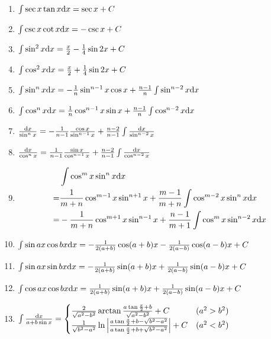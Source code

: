 \begin{small}
\begin{enumerate}
\item $ \int \sec x \tan x \mathrm{d} x = \sec x + C $

\item $ \int \csc x \cot x \mathrm{d} x = -\csc x + C $

\item $ \int \sin^2 x \mathrm{d} x = \frac{x}{2} - \frac{1}{4} \sin 2x + C $

\item $ \int \cos^2 x \mathrm{d} x = \frac{x}{2} + \frac{1}{4} \sin 2x + C $

\item $ \int \sin^n x \mathrm{d} x = -\frac{1}{n} \sin^{n-1} x \cos x + \frac{n-1}{n} \int \sin^{n-2} x \mathrm{d} x $

\item $ \int \cos^n x \mathrm{d} x = \frac{1}{n} \cos^{n-1} x \sin x + \frac{n-1}{n} \int \cos^{n-2} x \mathrm{d} x $

\item $ \frac{\mathrm{d} x}{\sin^n x} = -\frac{1}{n-1} \frac{\cos x}{\sin^{n-1}x} + \frac{n-2}{n-1} \int \frac{\mathrm{d} x}{\sin^{n-2}x} $

\item $ \frac{\mathrm{d} x}{\cos^n x} = \frac{1}{n-1} \frac{\sin x}{\cos^{n-1}x} + \frac{n-2}{n-1} \int \frac{\mathrm{d} x}{\cos^{n-2}x} $

\item \[ \begin{split} {} & \int \cos^m x \sin^n x \mathrm{d} x \\
	= & \frac{1}{m+n} \cos^{m-1} x \sin^{n+1}x + \frac{m-1}{m+n}\int\cos^{m-2}x\sin^nx\mathrm{d} x \\
	= & -\frac{1}{m+n} \cos^{m+1} x \sin^{n-1}x + \frac{n-1}{m+1} \int \cos^m x\sin^{n-2} x \mathrm{d} x \end{split} \]

\item $ \int \sin ax \cos bx \mathrm{d} x = -\frac{1}{2(a+b)}\cos(a+b)x - \frac{1}{2(a-b)}\cos(a-b)x + C $

\item $ \int \sin ax \sin bx \mathrm{d} x = -\frac{1}{2(a+b)}\sin(a+b)x + \frac{1}{2(a-b)}\sin(a-b)x + C $

\item $ \int \cos ax \cos bx \mathrm{d} x =  \frac{1}{2(a+b)}\sin(a+b)x + \frac{1}{2(a-b)}\sin(a-b)x + C $

\item $ \int \frac{\mathrm{d} x}{a + b \sin x} = \begin{cases}
\frac{2}{\sqrt{a^2-b^2}}\arctan\frac{a\tan\frac{x}{2}+b}{\sqrt{a^2-b^2}} + C & (a^2 > b^2) \\
\frac{1}{\sqrt{b^2-a^2}}\ln \left| \frac{a\tan\frac{x}{2}+b-\sqrt{b^2-a^2}}{a\tan\frac{x}{2}+b+\sqrt{b^2-a^2}} \right| + C & (a^2 < b^2)
\end{cases} $


\end{enumerate}
\end{small}
